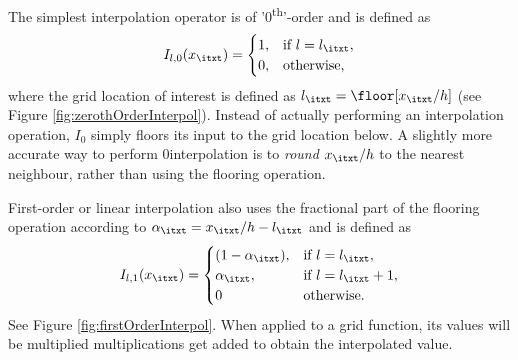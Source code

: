 The simplest interpolation operator is of '0\textsuperscript{th}'-order and is defined as
\begin{equation}\label{eq:zerothOrderI}
    I_{l,0}(x_\itxt) = \begin{cases}
        1, & \text{if}\ l = l_\itxt,\\
        0, & \text{otherwise},
    \end{cases}
\end{equation}
where the grid location of interest is defined as $l_\itxt = \floor[x_\itxt / h]$ (see Figure \ref{fig:zerothOrderInterpol}). Instead of actually performing an interpolation operation, $I_0$ simply floors its input to the grid location below. 
%
% 
%
A slightly more accurate way to perform 0\thOrder interpolation is to \textit{round} $x_\itxt/h$ to the nearest neighbour, rather than using the flooring operation. 

First-order or linear interpolation also uses the fractional part of the flooring operation according to $\alpha_\itxt = x_\itxt / h - l_\itxt$ and is defined as
\begin{equation}\label{eq:firstOrderI}
    I_{l,1}(x_\itxt) = \begin{cases}
        (1-\alpha_\itxt), & \text{if}\ l = l_\itxt,\\
        \alpha_\itxt , & \text{if}\ l = l_\itxt + 1,\\
        0 & \text{otherwise.}
    \end{cases}
\end{equation}
See Figure \ref{fig:firstOrderInterpol}. When applied to a grid function, its values will be multiplied multiplications get added to obtain the interpolated value. 

